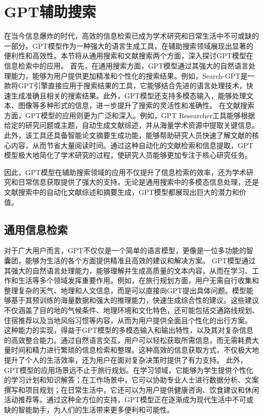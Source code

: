 \section{GPT辅助搜索}\label{sec:gpt-aided-writing}

在当今信息爆炸的时代，高效的信息检索已成为学术研究和日常生活中不可或缺的一部分。GPT模型作为一种强大的语言生成工具，在辅助搜索领域展现出显著的便利性和高效性。本节将从通用搜索和文献搜索两个方面，深入探讨GPT模型在信息检索中的应用。
首先，在通用搜索方面，GPT模型通过其强大的自然语言处理能力，能够为用户提供更加精准和个性化的搜索结果。例如，Search-GPT是一款将GPT引擎直接应用于搜索结果的工具，它能够结合先进的语言处理技术，快速生成准确且相关的搜索结果。此外，GPT模型还支持多模态输入，能够处理文本、图像等多种形式的信息，进一步提升了搜索的灵活性和准确性。
在文献搜索方面，GPT模型的应用则更为广泛和深入。例如，GPT Researcher工具能够根据给定的研究问题或主题，自动生成文献综述，并从海量学术资源中提取关键信息。此外，该工具还具备智能论文摘要生成功能，能够帮助研究人员快速了解文献的核心内容，从而节省大量阅读时间。通过这种自动化的文献检索和信息提取，GPT模型极大地简化了学术研究的过程，使研究人员能够更加专注于核心研究任务。

因此，GPT模型在辅助搜索领域的应用不仅提升了信息检索的效率，还为学术研究和日常信息获取提供了强大的支持。无论是通用搜索中的多模态信息处理，还是文献搜索中的自动化文献综述和摘要生成，GPT模型都展现出巨大的潜力和价值。

\subsection{通用信息检索}

对于广大用户而言，GPT不仅仅是一个简单的语言模型，更像是一位多功能的智囊团，能够为生活的各个方面提供精准且高效的建议和解决方案。
GPT模型通过其强大的自然语言处理能力，能够理解并生成高质量的文本内容，从而在学习、工作和生活等多个领域发挥重要作用。例如，在旅行规划方面，用户无需自行收集和整理复杂的天气、地理和人文信息，而是可以直接向GPT提出具体问题。模型能够基于其预训练的海量数据和强大的推理能力，快速生成综合性的建议。这些建议不仅涵盖了目的地的气候条件、地理环境和文化特色，还可能包括交通路线规划、住宿推荐以及当地风俗习惯等内容，从而为用户提供全面且个性化的出行方案。
这种能力的实现，得益于GPT模型的多模态输入和输出特性，以及其对复杂信息的高效整合能力。通过自然语言交互，用户可以轻松获取所需信息，而无需耗费大量时间和精力进行繁琐的信息检索和整理。这种高效的信息获取方式，不仅极大地提升了个人的生活效率，还为用户在面对复杂决策时提供了有力支持。
此外，GPT模型的应用场景远不止于旅行规划。在学习领域，它能够为学生提供个性化的学习计划和知识解答；在工作场景中，它可以协助专业人士进行数据分析、文案撰写和项目规划；在日常生活中，它还可以为用户提供健康咨询、饮食建议和休闲活动推荐等。通过这种全方位的支持，GPT模型正在逐渐成为现代生活中不可或缺的智能助手，为人们的生活带来更多便利和可能性。

